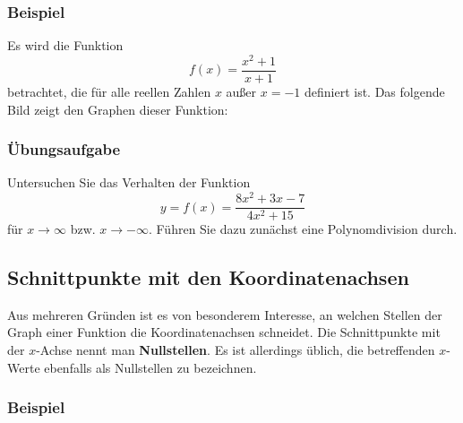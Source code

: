 \subsubsection{Beispiel}

Es wird die Funktion
\[ f(x) = \frac{x^2 + 1}{x + 1} \]
betrachtet, die für alle reellen Zahlen $x$ außer $x = -1$ definiert ist. Das folgende Bild zeigt den Graphen dieser Funktion:

\begin{center}
\end{center}\beispielende

\subsubsection{Übungsaufgabe}

\begin{graukasten}
  Untersuchen Sie das Verhalten der Funktion
  \[ y = f(x) = \frac{8x^2 + 3x - 7}{4x^2 + 15} \]
  für $x \rightarrow \infty$ bzw. $x \rightarrow -\infty$. Führen Sie dazu zunächst eine Polynomdivision durch.
\end{graukasten}

\subsection{Schnittpunkte mit den Koordinatenachsen}

Aus mehreren Gründen ist es von besonderem Interesse, an welchen Stellen der Graph einer Funktion die Koordinatenachsen schneidet. Die Schnittpunkte mit der $x$-Achse nennt man \textbf{Nullstellen}. Es ist allerdings üblich, die betreffenden $x$-Werte ebenfalls als Nullstellen zu bezeichnen.

\subsubsection{Beispiel}

